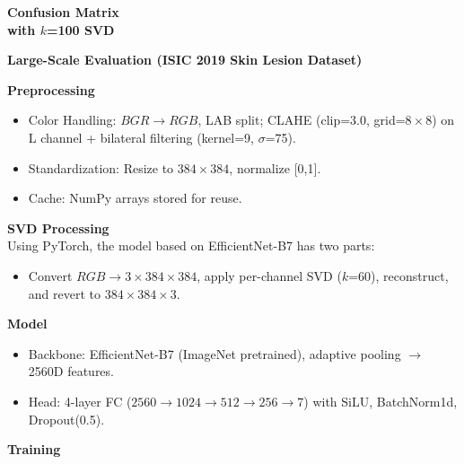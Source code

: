 \documentclass[a1paper,portrait,margin=0.8cm]{baposter}
\begin{document}
\begin{poster}
{\begin{minipage}[b]{0.235\textwidth}
\vspace{-0.3em}
\textbf{Confusion Matrix \\ with $k$=100 SVD}

\vspace{-0.3em}

\end{minipage}
\hfill
\begin{minipage}[b]{0.56\textwidth}

\noindent \textbf{Large-Scale Evaluation (ISIC 2019 Skin Lesion Dataset)}

\begin{minipage}[b]{0.46\textwidth}

\textbf{Preprocessing}
\begin{itemize}
    \item Color Handling: $BGR\!\rightarrow\! RGB$, LAB split; CLAHE (clip=3.0, grid=$8\!\times\!8$) on L channel + bilateral filtering (kernel=9, $\sigma$=75).
    \item Standardization: Resize to $384\!\times\!384$, normalize [0,1].
    \item Cache: NumPy arrays stored for reuse.
\end{itemize}
\vspace{0.2em}

\noindent \textbf{SVD Processing}\\
Using PyTorch, the model based on EfficientNet-B7 has two parts:
\vspace{0.2em}
\begin{itemize}
    \item Convert $RGB\!\rightarrow\! 3\!\times\!384\!\times\!384$, apply per-channel SVD ($k$=60), reconstruct, and revert to $384\!\times\!384\!\times\!3$.
\end{itemize}
\vspace{0.2em}

\noindent \textbf{Model}

\begin{itemize}
    \item Backbone: EfficientNet-B7 (ImageNet pretrained), adaptive pooling $\!\rightarrow\!$ 2560D features.
    \item Head: 4-layer FC ($2560\!\rightarrow\!1024\!\rightarrow\!512\!\rightarrow\!256\!\rightarrow\!7$) with SiLU, BatchNorm1d, Dropout(0.5).
\end{itemize}

\vspace{0.2em}

\noindent \textbf{Training}


\end{minipage}
\end{minipage}}
\end{poster}
\end{document}

